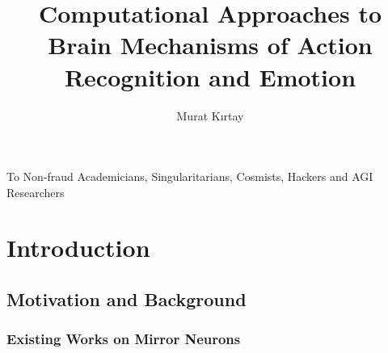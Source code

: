 \documentclass[a4,12pt]{ozu-thesis}
\title{Computational Approaches to Brain Mechanisms of Action Recognition and
Emotion}
\author{Murat K{\i}rtay}
\newcommand{\todo}[1]{\textcolor{red}{TODO: #1}\PackageWarning{TODO:}{#1!}}
\begin{document}


\begin{preliminary}

\begin{dedication}
\null\vfil
{\large
\begin{center}
To Non-fraud Academicians, Singularitarians, Cosmists, Hackers and AGI Researchers

\end{center}}
\vfil\null
\end{dedication}

\begin{abstract}



\end{abstract}

\begin{ozetce}

\end{ozetce}

\begin{acknowledgements}


\end{acknowledgements}


\contents
%

\end{preliminary}

\chapter{Introduction}



\section{Motivation and Background}


\subsection{Existing Works on Mirror Neurons}

\end{document}
